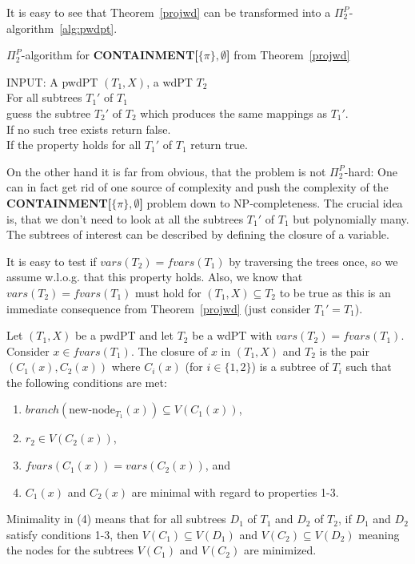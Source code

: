 It is easy to see that Theorem~\ref{projwd} can be transformed into a
$\Pi^P_2$-algorithm~\ref{alg:pwdpt}.

\begin{algorithm}
	\caption{$\Pi^P_2$-algorithm for
	\textbf{CONTAINMENT[$\{ \pi \},\emptyset$]} from Theorem~\ref{projwd}}
\label{alg:pwdpt}
INPUT: A pwdPT $(T_1,X)$, a wdPT $T_2$\\
For all subtrees $T_1'$ of $T_1$\\
guess the subtree $T_2'$ of $T_2$ which produces the same mappings as
$T_1'$. \\
If no such tree exists return false.\\
If the property holds for all $T_1'$ of $T_1$ return true.
\end{algorithm}

On the other hand it is far from obvious, 
that the problem is not $\Pi^P_2$-hard: One can in fact
get rid of one source of complexity and push the complexity of the\\
\textbf{CONTAINMENT[$\{\pi\},\emptyset$]} problem down to
NP-completeness.
The crucial idea is, that we don't need to look at all the subtrees $T_1'$ of
$T_1$ but polynomially many. The subtrees of interest can be described by
defining the closure of a variable.

It is easy to test if $vars(T_2) = fvars(T_1)$ by traversing the trees once, so
we assume w.l.o.g. that this property holds. Also, we know that $vars(T_2) =
fvars(T_1)$ must hold for $(T_1,X) \subseteq T_2$ to be true as this is an
immediate consequence from Theorem~\ref{projwd} (just consider $T_1' = T_1$).

\begin{definition}
	Let $(T_1,X)$ be a pwdPT and let $T_2$ be a wdPT with
	$vars(T_2) = fvars(T_1)$. Consider $x \in fvars(T_1)$. The closure
	of $x$ in $(T_1,X)$ and $T_2$ is the pair $(C_1(x),C_2(x))$ where
	$C_i(x)$ (for $i \in \{1,2\}$) is a subtree of $T_i$ such that the
	following conditions are met:
	\begin{enumerate}
		\item $branch(\mbox{new-node}_{T_1}(x)) \subseteq V(C_1(x))$,
		\item $r_2 \in V(C_2(x))$,
		\item $fvars(C_1(x)) = vars(C_2(x))$, and
		\item $C_1(x)$ and $C_2(x)$ are minimal with regard to properties 1-3.
	\end{enumerate}
	Minimality in (4) means that for all subtrees $D_1$ of $T_1$ and $D_2$ of
	$T_2$, if $D_1$ and $D_2$ satisfy conditions 1-3, then $V(C_1) \subseteq
	V(D_1)$ and $V(C_2) \subseteq V(D_2)$ meaning the nodes for the subtrees
	$V(C_1)$ and $V(C_2)$ are minimized.
\end{definition}

